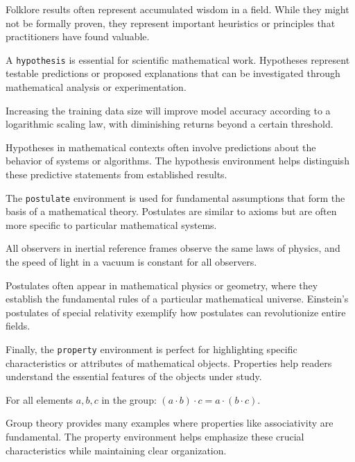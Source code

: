 \documentclass[9pt]{amsart}
\begin{document}
Folklore results often represent accumulated wisdom in a field. While they
might not be formally proven, they represent important heuristics or principles
that practitioners have found valuable.

A \texttt{hypothesis} is essential for scientific mathematical work. Hypotheses
represent testable predictions or proposed explanations that can be
investigated through mathematical analysis or experimentation.

\begin{hypothesis}
	Increasing the training data size will improve model accuracy according to a logarithmic scaling law, with diminishing returns beyond a certain threshold.
\end{hypothesis}

Hypotheses in mathematical contexts often involve predictions about the
behavior of systems or algorithms. The hypothesis environment helps distinguish
these predictive statements from established results.

The \texttt{postulate} environment is used for fundamental assumptions that
form the basis of a mathematical theory. Postulates are similar to axioms but
are often more specific to particular mathematical systems.

\begin{postulate}
	All observers in inertial reference frames observe the same laws of physics, and the speed of light in a vacuum is constant for all observers.
\end{postulate}

Postulates often appear in mathematical physics or geometry, where they
establish the fundamental rules of a particular mathematical universe.
Einstein's postulates of special relativity exemplify how postulates can
revolutionize entire fields.

Finally, the \texttt{property} environment is perfect for highlighting specific
characteristics or attributes of mathematical objects. Properties help readers
understand the essential features of the objects under study.

\begin{property}[Associativity]
	For all elements $a, b, c$ in the group: $(a \cdot b) \cdot c = a \cdot (b \cdot c)$.
\end{property}

Group theory provides many examples where properties like associativity are
fundamental. The property environment helps emphasize these crucial
characteristics while maintaining clear organization.
\end{document}
